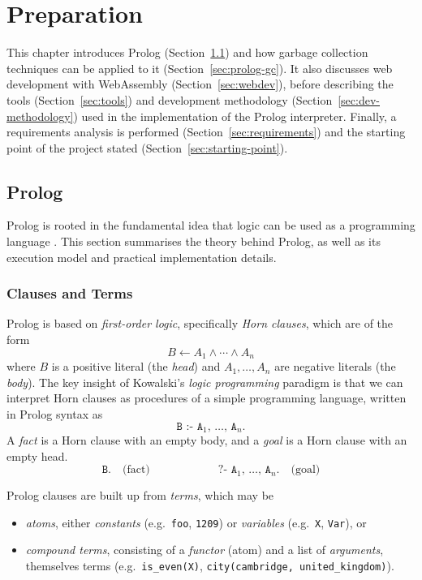 
\chapter{Preparation}

This chapter introduces Prolog (Section~\ref{sec:prolog}) and how garbage collection techniques can be applied to it (Section~\ref{sec:prolog-gc}). It also discusses web development with WebAssembly (Section~\ref{sec:webdev}), before describing the tools (Section~\ref{sec:tools}) and development methodology (Section~\ref{sec:dev-methodology}) used in the implementation of the Prolog interpreter. Finally, a requirements analysis is performed (Section~\ref{sec:requirements}) and the starting point of the project stated (Section~\ref{sec:starting-point}).

\section{Prolog}

\label{sec:prolog}

Prolog is rooted in the fundamental idea that logic can be used as a programming language \cite{kowalskiPredicateLogicProgramming1974}. This section summarises the theory behind Prolog, as well as its execution model and practical implementation details.

\subsection{Clauses and Terms}

Prolog is based on \emph{first-order logic}, specifically \emph{Horn clauses}, which are of the form
$$
B \leftarrow A_1 \land \cdots \land A_n
$$
where $B$ is a positive literal (the \emph{head}) and $A_1, \ldots, A_n$ are negative literals (the \emph{body}). The key insight of Kowalski's \emph{logic programming} paradigm is that we can interpret Horn clauses as procedures of a simple programming language, written in Prolog syntax as
$$
\texttt{B :- A$_1$, $\ldots$, A$_n$.}
$$
A \emph{fact} is a Horn clause with an empty body, and a \emph{goal} is a Horn clause with an empty head.
$$
\texttt{B.} \quad \text{(fact)} \qquad\qquad\qquad \texttt{?- A$_1$, $\ldots$, A$_n$.} \quad \text{(goal)}
$$

Prolog clauses are built up from \emph{terms}, which may be
\begin{itemize}
\item \emph{atoms}, either \emph{constants} (e.g.\ \texttt{foo}, \texttt{1209}) or \emph{variables} (e.g.\ \texttt{X}, \texttt{Var}), or
\item \emph{compound terms}, consisting of a \emph{functor} (atom) and a list of \emph{arguments}, themselves terms (e.g.\ \texttt{is\_even(X)}, \texttt{city(cambridge, united\_kingdom)}).
\end{itemize}

